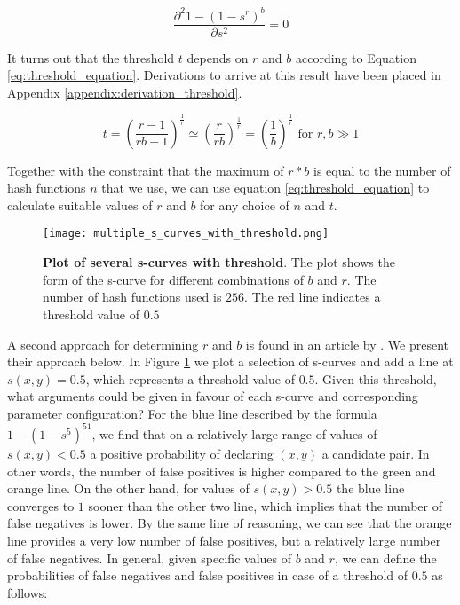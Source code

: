 \begin{equation}
    \frac{\partial^2 1 - (1-s^r)^b }{\partial s^2} = 0
    \label{eq:identifying_equation}
\end{equation}

It turns out that the threshold $t$ depends on $r$ and $b$ according to Equation \ref{eq:threshold_equation}. Derivations to arrive at this result have been placed in Appendix \ref{appendix:derivation_threshold}.

\begin{equation}
    t = (\frac{r-1}{rb-1})^{\frac{1}{r}} \simeq (\frac{r}{rb})^{\frac{1}{r}} = (\frac{1}{b})^{\frac{1}{r}} \text{ for } r,b \gg 1
    \label{eq:threshold_equation}
\end{equation}

Together with the constraint that the maximum of $r * b$ is equal to the number of hash functions $n$ that we use, we can use equation \ref{eq:threshold_equation} to calculate suitable values of $r$ and $b$ for any choice of $n$ and $t$. 

\begin{figure}
    \texttt{[image: multiple\_s\_curves\_with\_threshold.png]}
    \caption[Plot of several s-curves with threshold]{\textbf{Plot of several s-curves with threshold}. The plot shows the form of the s-curve for different combinations of $b$ and $r$. The number of hash functions used is $256$. The red line indicates a threshold value of $0.5$}
    \label{fig:multiple_s_curves_with_threshold}
\end{figure}

A second approach for determining $r$ and $b$ is found in an article by \cite{ZhuNPM16}. We present their approach below. In Figure \ref{fig:multiple_s_curves_with_threshold} we plot a selection of s-curves and add a line at $s(x,y) = 0.5$, which represents a threshold value of $0.5$. Given this threshold, what arguments could be given in favour of each s-curve and corresponding parameter configuration? For the blue line described by the formula $1 - (1-s^5)^{51}$, we find that on a relatively large range of values of $s(x,y) < 0.5$ a positive probability of declaring $(x, y)$ a candidate pair. In other words, the number of false positives is higher compared to the green and orange line. On the other hand, for values of $s(x, y) > 0.5$ the blue line converges to $1$ sooner than the other two line, which implies that the number of false negatives is lower. By the same line of reasoning, we can see that the orange line provides a very low number of false positives, but a relatively large number of false negatives. In general, given specific values of $b$ and $r$, we can define the probabilities of false negatives and false positives in case of a threshold of $0.5$ as follows:

